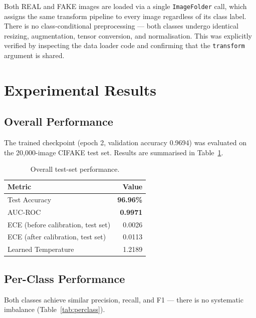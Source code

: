 \documentclass[12pt,a4paper]{article}
\begin{document}
Both REAL and FAKE images are loaded via a single \texttt{ImageFolder} call, which assigns the same transform pipeline to every image regardless of its class label. There is no class-conditional preprocessing --- both classes undergo identical resizing, augmentation, tensor conversion, and normalisation. This was explicitly verified by inspecting the data loader code and confirming that the \texttt{transform} argument is shared.

\section{Experimental Results}

\subsection{Overall Performance}

The trained checkpoint (epoch 2, validation accuracy 0.9694) was evaluated on the 20,000-image CIFAKE test set. Results are summarised in Table~\ref{tab:overall}.

\begin{table}[H]
\centering
\caption{Overall test-set performance.}
\label{tab:overall}
\begin{tabular}{lr}
\toprule
\textbf{Metric} & \textbf{Value} \\
\midrule
Test Accuracy                        & \textbf{96.96\%} \\
AUC-ROC                             & \textbf{0.9971} \\
ECE (before calibration, test set)   & 0.0026 \\
ECE (after calibration, test set)    & 0.0113 \\
Learned Temperature                  & 1.2189 \\
\bottomrule
\end{tabular}
\end{table}

\subsection{Per-Class Performance}

Both classes achieve similar precision, recall, and F1 --- there is no systematic imbalance (Table~\ref{tab:perclass}).
\end{document}

